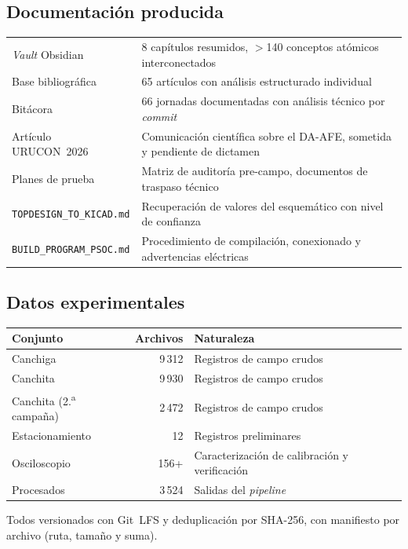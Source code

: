 \subsection{Documentaci\'on producida}

\begin{center}\footnotesize
\begin{tabularx}{\textwidth}{@{}l X@{}}
\toprule
\emph{Vault} Obsidian & 8 cap\'itulos resumidos, $>$140 conceptos at\'omicos interconectados \\
Base bibliogr\'afica & 65 art\'iculos con an\'alisis estructurado individual \\
Bit\'acora & 66 jornadas documentadas con an\'alisis t\'ecnico por \emph{commit} \\
Art\'iculo URUCON~2026 & Comunicaci\'on cient\'ifica sobre el DA-AFE, sometida y pendiente de dictamen \\
Planes de prueba & Matriz de auditor\'ia pre-campo, documentos de traspaso t\'ecnico \\
\texttt{TOPDESIGN\_TO\_KICAD.md} & Recuperaci\'on de valores del esquem\'atico con nivel de confianza \\
\texttt{BUILD\_PROGRAM\_PSOC.md} & Procedimiento de compilaci\'on, conexionado y advertencias el\'ectricas \\
\bottomrule
\end{tabularx}
\end{center}

\subsection{Datos experimentales}

\begin{center}\footnotesize
\begin{tabularx}{\textwidth}{@{}l r X@{}}
\toprule
\textbf{Conjunto} & \textbf{Archivos} & \textbf{Naturaleza} \\
\midrule
Canchiga & 9\,312 & Registros de campo crudos \\
Canchita & 9\,930 & Registros de campo crudos \\
Canchita (2.\textsuperscript{a} campa\~na) & 2\,472 & Registros de campo crudos \\
Estacionamiento & 12 & Registros preliminares \\
Osciloscopio & 156+ & Caracterizaci\'on de calibraci\'on y verificaci\'on \\
Procesados & 3\,524 & Salidas del \emph{pipeline} \\
\bottomrule
\end{tabularx}
\end{center}

Todos versionados con Git~LFS y deduplicaci\'on por SHA-256, con manifiesto por archivo
(ruta, tama\~no y suma).
